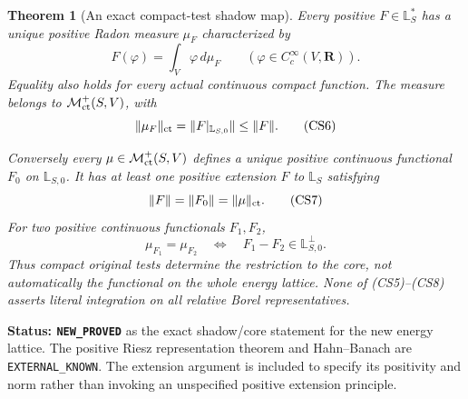 \documentclass[11pt,a4paper]{article}
\numberwithin{equation}{section}
\newtheorem{theorem}{Theorem}[section]
\theoremstyle{definition}
\theoremstyle{remark}
\begin{document}
\begin{theorem}[An exact compact-test shadow map]
\label{thm:r12-positive-dual-shadow}
Every positive $F\in\mathbb L_S^*$ has a unique positive Radon
measure $\mu_F$ characterized by
\[
             F(\varphi)=\int_V\varphi\,d\mu_F
                 \qquad(\varphi\in C_c^\infty(V,\mathbf R)).
 \tag{CS5}
\]
Equality also holds for every actual continuous compact function.
The measure belongs to $\mathcal M_{\rm ct}^+(S,V)$, with
\[
        \|\mu_F\|_{\rm ct}
             =\|F|_{\mathbb L_{S,0}}\|
             \leq\|F\|.
 \tag{CS6}
\]

Conversely every $\mu\in\mathcal M_{\rm ct}^+(S,V)$ defines a
unique positive continuous functional $F_0$ on $\mathbb L_{S,0}$.
It has at least one positive extension $F$ to $\mathbb L_S$
satisfying
\[
                       \|F\|=\|F_0\|=\|\mu\|_{\rm ct}.
 \tag{CS7}
\]
For two positive continuous functionals $F_1,F_2$,
\[
 \mu_{F_1}=\mu_{F_2}
   \quad\Longleftrightarrow\quad
      F_1-F_2\in\mathbb L_{S,0}^{\perp}.
 \tag{CS8}
\]
Thus compact original tests determine the restriction to the
core, not automatically the functional on the whole energy
lattice. None of (CS5)--(CS8) asserts literal integration on
all relative Borel representatives.
\end{theorem}

\noindent\textbf{Status: \texttt{NEW\_PROVED}} as the exact
shadow/core statement for the new energy lattice.
The positive Riesz representation theorem and Hahn--Banach are
\texttt{EXTERNAL\_KNOWN}. The extension argument is included to
specify its positivity and norm rather than invoking an unspecified
positive extension principle.
\end{document}
